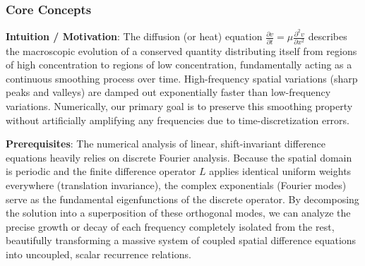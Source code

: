 \begin{solution}
\subsubsection*{Core Concepts}
\textbf{Intuition / Motivation}: The diffusion (or heat) equation $\frac{\partial v}{\partial t} = \mu \frac{\partial^2 v}{\partial x^2}$ describes the macroscopic evolution of a conserved quantity distributing itself from regions of high concentration to regions of low concentration, fundamentally acting as a continuous smoothing process over time. High-frequency spatial variations (sharp peaks and valleys) are damped out exponentially faster than low-frequency variations. Numerically, our primary goal is to preserve this smoothing property without artificially amplifying any frequencies due to time-discretization errors.

\textbf{Prerequisites}: The numerical analysis of linear, shift-invariant difference equations heavily relies on discrete Fourier analysis. Because the spatial domain is periodic and the finite difference operator $L$ applies identical uniform weights everywhere (translation invariance), the complex exponentials (Fourier modes) serve as the fundamental eigenfunctions of the discrete operator. By decomposing the solution into a superposition of these orthogonal modes, we can analyze the precise growth or decay of each frequency completely isolated from the rest, beautifully transforming a massive system of coupled spatial difference equations into uncoupled, scalar recurrence relations.


\end{solution}
